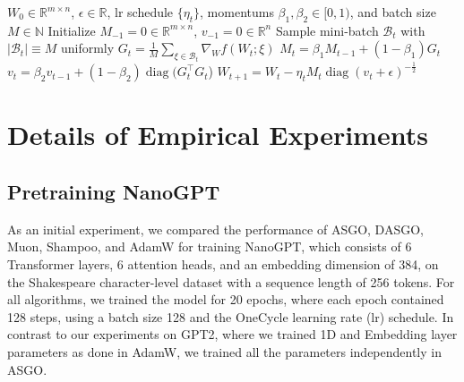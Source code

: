 \documentclass{article}
\theoremstyle{remark}
\newcommand{\Abs}[1]{\left\vert #1 \right\vert}
\newcommand{\cB}{\mathcal{B}}
\newcommand{\RR}{\mathbb{R}}
\begin{document}
\begin{algorithm}[h]
   \caption{Implementation of DASGO (\textbf{D}iagonal \textbf{A}daptive \textbf{S}tructured \textbf{G}radient \textbf{O}ptimization)}
   \label{alg:practical_dasgo}
\begin{algorithmic}[1]
    $W_0\in \RR^{m\times n}$, $\epsilon \in \RR$, lr schedule $\{\eta_t\}$, momentums $\beta_1,\beta_2 \in [0,1)$, and batch size $M\in \mathbb{N}$
   \STATE Initialize $M_{-1} = 0 \in \RR^{m\times n}$, $v_{-1}=0 \in \RR^{n}$
   \STATE Sample mini-batch $\cB_t$ with $\Abs{\cB_t} \equiv M$ uniformly
   \STATE $G_t = \frac{1}{M} \sum_{\xi\in\cB_t} \nabla_W f(W_t;\xi)$
   \STATE $M_t = \beta_1 M_{t-1} + (1 - \beta_1)G_t$
   \STATE $v_t = \beta_2 v_{t-1} + (1 - \beta_2) \operatorname{diag}(G_t^\top G_t$)
   \STATE
   $W_{t+1} = W_t - \eta_t M_t \operatorname{diag}(v_t + \epsilon)^{-\frac{1}{2}}$
   \ENDFOR
\end{algorithmic}
\end{algorithm}

\section{Details of Empirical Experiments}\label{sec:HyperparamTuning}
\subsection{Pretraining NanoGPT}\label{appendix:nanogpt}

As an initial experiment, we compared the performance of ASGO, DASGO, Muon, Shampoo, and AdamW for training NanoGPT, which consists of 6 Transformer layers, 6 attention heads, and an embedding dimension of 384, on the Shakespeare character-level dataset with a sequence length of 256 tokens. For all algorithms, we trained the model for 20 epochs, where each epoch contained 128 steps, using a batch size 128 and the OneCycle learning rate (lr) schedule. In contrast to our experiments on GPT2, where we trained 1D and Embedding layer parameters as done in AdamW, we trained all the parameters independently in ASGO.
\end{document}
